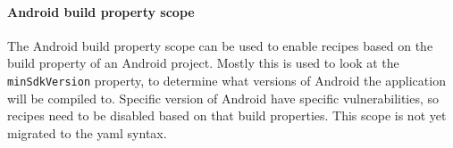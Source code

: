 \paragraph{Android build property scope} The {Android build property scope} can be used to enable recipes based on the build property of an Android project. Mostly this is used to look at the \texttt{minSdkVersion} property, to determine what versions of Android the application will be compiled to. Specific version of Android have specific vulnerabilities, so recipes need to be disabled based on that build properties. This scope is not yet migrated to the \gls{yaml} syntax.